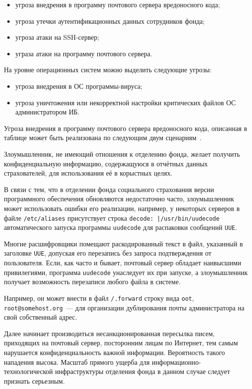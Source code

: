 \begin{itemize}
\item угроза внедрения в программу почтового сервера вредоносного кода;
\item угроза утечки аутентификационных данных сотрудников фонда;
\item угроза атаки на SSH-сервер;
\item уграза атаки на программу почтового сервера.
\end{itemize}

\point На уровне операционных систем можно выделить следующие угрозы:

\begin{itemize}
\item угроза внедрения в ОС программы-вируса;
\item угроза уничтожения или некорректной настройки критических файлов
  ОС администратором ИБ.
\end{itemize}

\point Угроза внедрения в программу почтового сервера вредоносного
кода, описанная в таблице может быть реализована по следующим двум
сценариям~\cite{3}.

\point Злоумышленник, не имеющий отношения к отделению фонда, желает
получить конфиденциальную информацию, содержащуюся в отчётных данных
страхователей, для использования её в корыстных целях.

В связи с тем, что в отделении фонда социального страхования версии
программного обеспечения обновляются недостаточно часто, злоумышленник
может использовать ошибки его реализации, например, у некоторых
серверов в файле \texttt{/etc/aliases} присутствует строка
\texttt{decode: |/usr/bin/uudecode} автоматического запуска программы
\texttt{uudecode} для распаковки сообщений \texttt{UUE}.

Многие расшифровщики помещают раскодированный текст в файл, указанный
в заголовке \texttt{UUE}, допуская его перезапись без запроса
подтверждения от пользователя. Если, как часто и бывает, почтовый
сервер обладает наивысшими привилегиями, программа \texttt{uudecode}
унаследует их при запуске, а злоумышленник получает возможность
перезаписи любого файла в системе.

Например, он может внести в файл \texttt{/.forward} строку вида
\texttt{oot}, \texttt{root@somehost.org}~--- для организации
дублирования почты администратора на свой собственный адрес.

Далее начинает производиться несанкционированная пересылка писем,
приходящих на почтовый сервер, посторонним лицам по Интернет, тем
самым нарушается конфиденциальность важной информации. Вероятность
такого нападения высока. Масштаб прямого ущерба для
информационно-технологической инфраструктуры отделения фонда в данном
случае следует признать серьезным.

